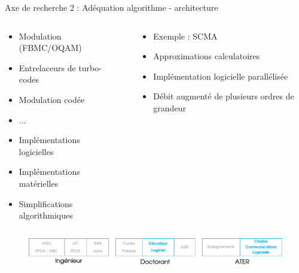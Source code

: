 \documentclass[t,compress,mathserif,12pt,xcolor=dvipsnames]{beamer}
\begin{document}
\begin{frame}[t]{Axe de recherche 2 : Adéquation algorithme - architecture}
  \begin{minipage}[t][5.0cm][t]{\textwidth}
    \begin{columns}[T]
      \begin{column}{0.48\textwidth}
        \begin{itemize}
          \item<+-> Modulation (FBMC/OQAM)
          \item<+-> Entrelaceurs de turbo-codes
          \item<+-> Modulation codée
          \item<+-> ...
          \vspace{0.5cm}
          \item<+-> Implémentations logicielles
          \item<+-> Implémentations matérielles
          \item<+-> Simplifications algorithmiques
        \end{itemize}
      \end{column}
      \begin{column}{0.04\textwidth}
      \end{column}
      \begin{column}{0.48\textwidth}
        \begin{itemize}
          \item<+-> Exemple : SCMA
          \item<+-> Approximations calculatoires
          \item<+-> Implémentation logicielle parallélisée
          \item<+-> Débit augmenté de plusieurs ordres de grandeur
        \end{itemize}
      \end{column}
    \end{columns}
  \end{minipage}
  \begin{figure}[htp]
    \centering
    \includegraphics[width=\textwidth]{fig/frise21}
  \end{figure}
\end{frame}
\end{document}
